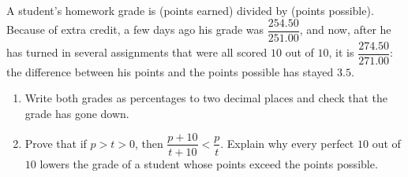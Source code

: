 A student's homework grade is (points earned) divided by (points possible). Because of extra credit, a few days ago his grade was $\dfrac{254.50}{251.00}$, and now, after he has turned in several assignments that were all scored $10$ out of $10$, it is $\dfrac{274.50}{271.00}$: the difference between his points and the points possible has stayed $3.5$.
\begin{enumerate}
\item[(a)] Write both grades as percentages to two decimal places and check that the grade has gone down.
\item[(b)] Prove that if $p>t>0$, then $\dfrac{p+10}{t+10}<\dfrac pt$. Explain why every perfect $10$ out of $10$ lowers the grade of a student whose points exceed the points possible.
\end{enumerate}
